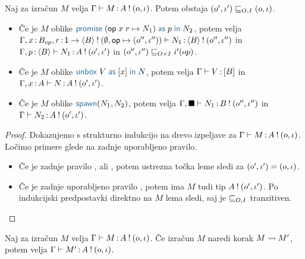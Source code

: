 \begin{lema}\label{lem:inversion-lema-2}
	Naj za izračun $M$ velja $\Gamma \vdash M \mathinner{:} A \mathbin{!} (o, \iota)$. Potem obstaja $(o', \iota') \sqsubseteq_{O, I} (o, \iota)$.
	\begin{itemize}
		\item Če je $M$ oblike $\tmwithrec{op}{x}{r}{N_1}{p}{N_2}$, potem velja $\Gamma, x \mathinner{:} B_{op}, r \mathinner{:} \mathsf{1} \to \langle B \rangle \mathbin{!} (\emptyset, \mathsf{op} \mapsto (o'', \iota'')) \vdash N_1 \mathinner{:} \langle B \rangle \mathbin{!} (o'', \iota'')$ in $\Gamma, p \mathinner{:} \langle B \rangle \vdash N_1 \mathinner{:} A \mathbin{!} (o', \iota')$ in $(o'',\iota'') \sqsubseteq_{O \times I} i'(op)$.
		
		\item Če je $M$ oblike $\tmunbox{V}{x}{N}$, potem velja $\Gamma \vdash V \mathinner{:} [B]$ in $\Gamma, x \mathinner{:} A \vdash N \mathinner{:} A \mathbin{!} (o', \iota')$.
		
		\item Če je $M$ oblike $\tmspawn{N_1}{N_2}$, potem velja $\Gamma, \blacksquare \vdash N_1 \mathinner{:} B \mathbin{!} (o'', \iota'')$ in $\Gamma \vdash N_2 \mathinner{:} A \mathbin{!} (o', \iota')$.
	\end{itemize}
\end{lema}

\begin{proof}
	Dokazujemo s strukturno indukcijo na drevo izpeljave za $\Gamma \vdash M \mathinner{:} A \mathbin{!} (o, \iota)$.
	Ločimo primere glede na zadnje uporabljeno pravilo.
	
	\begin{itemize}
		\item Če je zadnje pravilo ,  ali , potem ustrezna točka leme sledi za $(o', \iota') = (o, \iota)$.
		
		\item Če je zadnje uporabljeno pravilo , potem ima $M$ tudi tip $A \mathbin{!} (o', \iota')$. Po indukcijski predpostavki direktno na $M$ lema sledi, saj je $\sqsubseteq_{O, I}$ tranzitiven.
	\end{itemize}
\end{proof}


\begin{trditev}[o ohranitvi]\label{trd:ohranitev-izracuni-2}
	Naj za izračun $M$ velja $\Gamma \vdash M \mathinner{:} A \mathbin{!} (o, \iota)$. Če izračun $M$ naredi korak $M \leadsto M'$, potem velja $\Gamma \vdash M' \mathinner{:} A \mathbin{!} (o, \iota)$.
\end{trditev}

